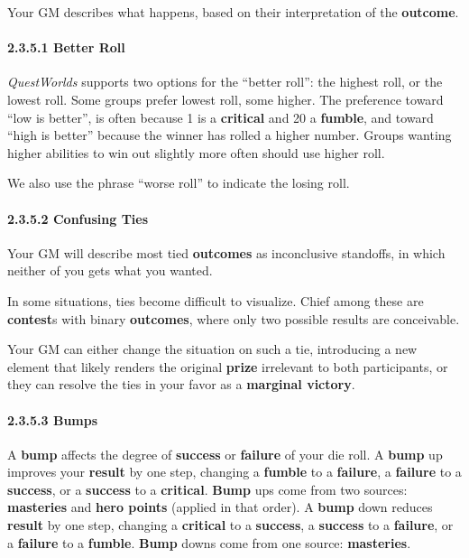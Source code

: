 \documentclass[
]{article}
\begin{document}
Your GM describes what happens, based on their interpretation of the
\textbf{outcome}.

\hypertarget{better-roll}{%
\paragraph{2.3.5.1 Better Roll}\label{better-roll}}

\emph{QuestWorlds} supports two options for the ``better roll'': the
highest roll, or the lowest roll. Some groups prefer lowest roll, some
higher. The preference toward ``low is better'', is often because 1 is a
\textbf{critical} and 20 a \textbf{fumble}, and toward ``high is
better'' because the winner has rolled a higher number. Groups wanting
higher abilities to win out slightly more often should use higher roll.

We also use the phrase ``worse roll'' to indicate the losing roll.

\hypertarget{confusing-ties}{%
\paragraph{2.3.5.2 Confusing Ties}\label{confusing-ties}}

Your GM will describe most tied \textbf{outcomes} as inconclusive
standoffs, in which neither of you gets what you wanted.

In some situations, ties become difficult to visualize. Chief among
these are \textbf{contest}s with binary \textbf{outcomes}, where only
two possible results are conceivable.

Your GM can either change the situation on such a tie, introducing a new
element that likely renders the original \textbf{prize} irrelevant to
both participants, or they can resolve the ties in your favor as a
\textbf{marginal victory}.

\hypertarget{bumps}{%
\paragraph{2.3.5.3 Bumps}\label{bumps}}

A \textbf{bump} affects the degree of \textbf{success} or
\textbf{failure} of your die roll. A \textbf{bump} up improves your
\textbf{result} by one step, changing a \textbf{fumble} to a
\textbf{failure}, a \textbf{failure} to a \textbf{success}, or a
\textbf{success} to a \textbf{critical}. \textbf{Bump} ups come from two
sources: \textbf{masteries} and \textbf{hero points} (applied in that
order). A \textbf{bump} down reduces \textbf{result} by one step,
changing a \textbf{critical} to a \textbf{success}, a \textbf{success}
to a \textbf{failure}, or a \textbf{failure} to a \textbf{fumble}.
\textbf{Bump} downs come from one source: \textbf{masteries}.
\end{document}
